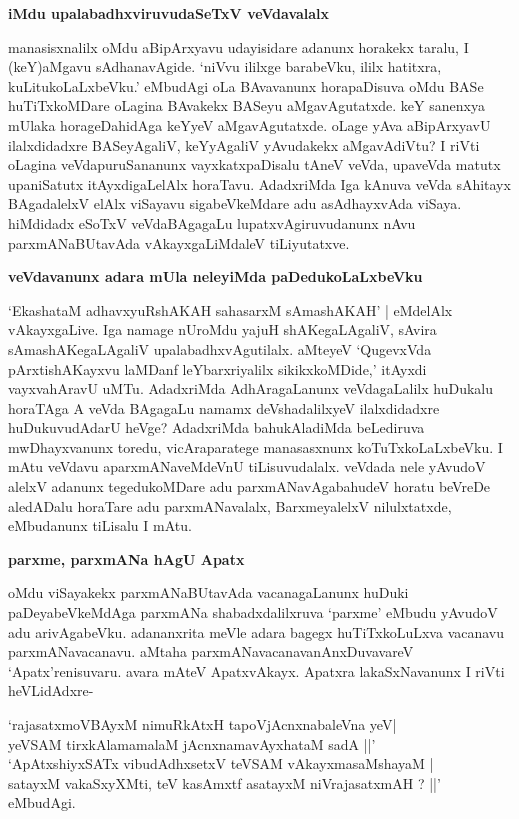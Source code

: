 {\bigskip
\noindent
{\large\bf iMdu upalabadhxviruvudaSeTxV veVdavalalx}}\label{page134}
\medskip

\noindent
manasisxnalilx oMdu aBipArxyavu udayisidare adanunx horakekx taralu, I (keY)aMgavu sAdhana\-vAgide. `niVvu ililxge barabeVku, ililx hatitxra, kuLitukoLaLxbeVku.' eMbudAgi oLa BAvavanunx hora\-paDisuva oMdu BASe huTiTxkoMDare oLagina BAvakekx BASeyu aMgavAgutatxde. keY sanenxya mUlaka\- horageDahidAga keYyeV aMgavAgutatxde. oLage yAva aBipArxyavU ilalxdidadxre BASe\-yAgaliV, keYyA\-galiV yAvudakekx aMgavAdiVtu? I riVti oLagina veVdapuruSananunx vayxkatxpaDisalu tAneV veVda, upa\-veVda matutx upaniSatutx itAyxdigaLelAlx horaTavu. AdadxriMda Iga kAnuva veVda sAhitayx BAga\-dalelxV elAlx viSayavu sigabeVkeMdare adu asAdhayxvAda viSaya. hiMdidadx eSoTxV veVdaBAgagaLu lupatx\-vAgiru\-vudanunx nAvu parxmANaBUtavAda vAkayxgaLiMdaleV tiLiyutatxve.

{\bigskip
\noindent
{\large\bf veVdavanunx adara mUla neleyiMda paDedukoLaLxbeVku}}\label{page135}
\medskip

\noindent
`EkashataM adhavxyuRshAKAH sahasarxM sAmashAKAH' |\label{135} eMdelAlx vAkayxgaLive. Iga namage nUroMdu yajuH shAKegaLAgaliV, sAvira sAmashAKegaLAgaliV upalabadhxvAgutilalx. aMteyeV `QugevxVda pArxti\-shAKayxvu laMDanf leYbarxriyalilx sikikxkoMDide,' itAyxdi vayxvahAravU uMTu. AdadxriMda AdhAra\-gaLanunx veVdagaLalilx huDukalu horaTAga A veVda BAgagaLu namamx deVshadalilxyeV ilalxdidadxre huDukuvu\-dAdarU heVge? AdadxriMda bahukAladiMda beLediruva mwDhayxvanunx toredu, vicAraparatege manasasxnunx koTuTx\-koLaLx\-beVku. I mAtu veVdavu aparxmANaveMdeVnU tiLisuvudalalx. veVdada nele yAvudoV alelxV adanunx tegedukoMDare adu parxmANavAgabahudeV horatu beVreDe aledADalu horaTare adu parx\-mANa\-valalx, BarxmeyalelxV nilulxtatxde, eMbudanunx tiLisalu I mAtu.

{\bigskip
\noindent
{\large\bf parxme, parxmANa hAgU Apatx}}\label{page135}
\medskip

\noindent
oMdu viSayakekx parxmANaBUtavAda vacanagaLanunx huDuki paDeyabeVkeMdAga parxmANa shabadx\-dalilx\-ruva `parxme' eMbudu yAvudoV adu arivAgabeVku. adananxrita meVle adara bagegx huTiTxkoLuLxva vaca\-navu parxmANavacanavu. aMtaha parxmANavacanavanAnxDuvavareV `Apatx'renisuvaru. avara mAteV Apatx\-vAkayx. Apatxra lakaSxNavanunx I riVti heVLidAdxre-

\begin{shloka}
`rajasatxmoVBAyxM nimuRkAtxH tapoVjAcnxnabaleVna yeV|\\\label{135}
yeVSAM tirxkAlamamalaM jAcnxnamavAyxhataM sadA ||'\\
`ApAtxshiyxSATx vibudAdhxsetxV teVSAM vAkayxmasaMshayaM |\\
satayxM vakaSxyXMti, teV kasAmxtf asatayxM niVrajasatxmAH ? ||' eMbudAgi.
\end{shloka}

